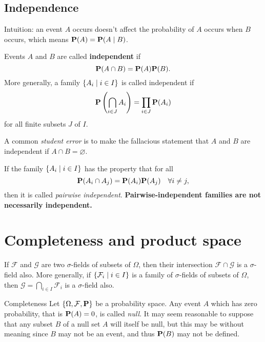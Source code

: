 \subsection{Independence}
Intuition: an event $A$ occurs doesn't affect the probability of $A$ occurs when $B$ occurs, which means $\mathbf{P}(A) = \mathbf{P}(A\;\vert\; B)$.

\begin{definition}
Events $A$ and $B$ are called \textbf{independent} if 
\begin{equation*}
    \mathbf{P}(A \cap B) = \mathbf{P}(A) \mathbf{P}(B).
\end{equation*}
More generally, a family $\{A_i \;\vert\; i \in I\}$ is called independent if
\begin{equation*}
    \mathbf{P} \left( \bigcap_{i \in J} A_i \right) = \prod_{i\in J} \mathbf{P}(A_i)
\end{equation*}
for all finite subsets $J$ of $I$. 
\end{definition}

\begin{caution}
A common \emph{student error} is to make the fallacious statement that $A$ and $B$ are independent if $A \cap B = \varnothing$.
\end{caution}

\begin{remark}
If the family $\{A_i \;\vert\; i \in I\}$ has the property that 
for all 
\begin{equation*}
    \mathbf{P}(A_i \cap A_j) = \mathbf{P}(A_i) \mathbf{P}(A_j) \quad \forall i\neq j, 
\end{equation*}
then it is called \emph{pairwise independent}. \textbf{Pairwise-independent families are not necessarily independent.} 
\end{remark}

\section{Completeness and product space}
\begin{lemma}
If $\mathcal{F}$ and $\mathcal{G}$ are two $\sigma$-fields of subsets of $\Omega$, then their intersection $\mathcal{F} \cap \mathcal{G}$ is a $\sigma$-field also. More generally, if $\{ \mathcal{F}_i \;\vert\;  i \in I \}$ is a family of $\sigma$-fields of subsets of $\Omega$, then $\mathcal{G} = \bigcap_{i\in I} \mathcal{F}_i $ is a $\sigma$-field also. 
\end{lemma}

\begin{newnotion}{Completeness}
Let $\{\Omega, \mathcal{F}, \mathbf{P}\}$ be a probability space. Any event $A$ which has zero probability, that is $\mathbf{P}(A) = 0$, is called \emph{null}. It may seem reasonable to suppose that any subset $B$ of a null set $A$ will itself be null, but this may be without meaning since $B$ may not be an event, and thus $\mathbf{P}(B)$ may not be defined. 
\end{newnotion}

